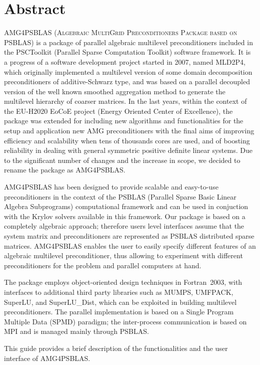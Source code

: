 \section*{Abstract}
\ifpdf
{}
\fi

\textsc{AMG4PSBLAS (Algebraic MultiGrid Preconditioners Package
based on PSBLAS}) is a package of parallel algebraic multilevel preconditioners included in the PSCToolkit (Parallel Sparse Computation Toolkit) software framework.
It is a progress of a software development project started in 2007, named MLD2P4, which originally implemented a 
multilevel version of some domain decomposition preconditioners of additive-Schwarz type, and was based on a parallel decoupled version of the well known smoothed
aggregation method to generate the multilevel hierarchy of coarser matrices. 
In the last years, within the context of the EU-H2020 EoCoE project (Energy Oriented Center of Excellence), the package was extended for including new algorithms and 
functionalities for the  setup and application new AMG preconditioners with the final aims of improving efficiency and scalability when tens of thousands cores are
used, and of boosting reliability in dealing with general symmetric positive definite linear systems. 
Due to the significant number of changes and the increase in scope, we decided to rename the package as AMG4PSBLAS.

AMG4PSBLAS has been designed to provide scalable and easy-to-use preconditioners
in the context of the PSBLAS (Parallel Sparse Basic Linear Algebra Subprograms)
computational framework and can be used in conjuction with the Krylov solvers
available in this framework.
Our package is based on a completely algebraic approach; therefore
users level interfaces assume that the system matrix and
preconditioners are represented as PSBLAS distributed sparse matrices.
AMG4PSBLAS enables the user to easily specify different
features of an algebraic multilevel preconditioner, thus allowing to experiment
with different preconditioners for the problem and parallel computers at hand.

The package employs object-oriented design techniques in
Fortran~2003, with interfaces to additional third party libraries
such as MUMPS, UMFPACK, SuperLU, and SuperLU\_Dist, which
can be exploited in building multilevel preconditioners. The parallel
implementation is based on a Single Program Multiple Data (SPMD)
paradigm; the inter-process communication is based on MPI and
is managed mainly through PSBLAS.

This guide provides a brief description of the functionalities and
the user interface of AMG4PSBLAS. 
